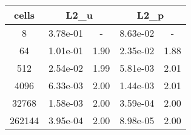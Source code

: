 \documentclass[10pt]{report}
\begin{document}
\begin{table}[H]
\begin{center}
\begin{tabular}{|c|c|c|c|c|} \hline
cells & 
\multicolumn{2}{|c|}{L2_u} & 
\multicolumn{2}{|c|}{L2_p}\\ \hline
8 & 3.78e-01 & - & 8.63e-02 & -\\ \hline
64 & 1.01e-01 & 1.90 & 2.35e-02 & 1.88\\ \hline
512 & 2.54e-02 & 1.99 & 5.81e-03 & 2.01\\ \hline
4096 & 6.33e-03 & 2.00 & 1.44e-03 & 2.01\\ \hline
32768 & 1.58e-03 & 2.00 & 3.59e-04 & 2.00\\ \hline
262144 & 3.95e-04 & 2.00 & 8.98e-05 & 2.00\\ \hline
\end{tabular}
\end{center}
\end{table}
\end{document}

